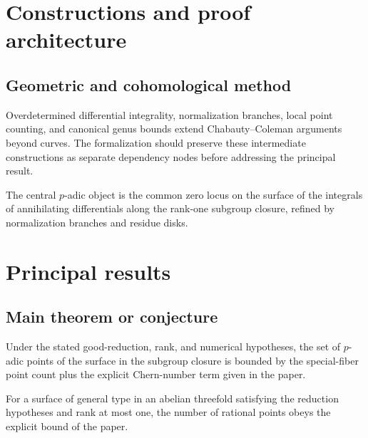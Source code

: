 \chapter{Constructions and proof architecture}
\label{chap:chabauty-coleman-bound-surfaces-method}

\section{Geometric and cohomological method}
\label{sec:chabauty-coleman-bound-surfaces-method}

Overdetermined differential integrality, normalization branches, local point counting, and canonical genus bounds extend Chabauty--Coleman arguments beyond curves. The formalization should preserve these intermediate constructions
as separate dependency nodes before addressing the principal result.

\begin{definition}
\label{chabauty-coleman-bound-surfaces-central-object}
The central $p$-adic object is the common zero locus on the surface of the integrals of annihilating differentials along the rank-one subgroup closure, refined by normalization branches and residue disks.
\notready
\end{definition}

\chapter{Principal results}
\label{chap:chabauty-coleman-bound-surfaces-results}

\section{Main theorem or conjecture}
\label{sec:chabauty-coleman-bound-surfaces-results}

\begin{theorem}
\label{chabauty-coleman-bound-surfaces-main}
Under the stated good-reduction, rank, and numerical hypotheses, the set of $p$-adic points of the surface in the subgroup closure is bounded by the special-fiber point count plus the explicit Chern-number term given in the paper.
\notready
\end{theorem}

\begin{theorem}
\label{chabauty-coleman-bound-surfaces-secondary}
For a surface of general type in an abelian threefold satisfying the reduction hypotheses and rank at most one, the number of rational points obeys the explicit bound of the paper.
\notready
\end{theorem}

